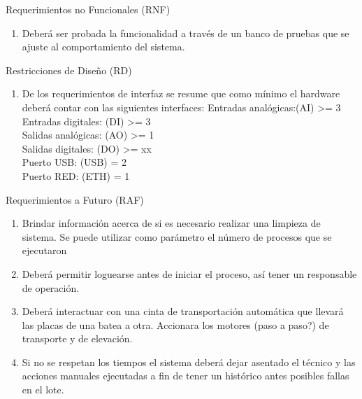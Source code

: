 \begin{enumerate}
\begin{enumerate}
\end{enumerate}

\item Requerimientos no Funcionales (RNF)
\begin{enumerate}
\item Deberá ser probada la funcionalidad a través de un banco de pruebas que se ajuste al comportamiento del sistema. 
\end{enumerate}

\item Restricciones de Diseño (RD)
\begin{enumerate}
\item De los requerimientos de interfaz se resume que como mínimo el hardware deberá contar con las siguientes interfaces:
Entradas analógicas:(AI) >= 3	\\
Entradas digitales: (DI) >= 3	\\
Salidas analógicas: (AO) >= 1	\\
Salidas digitales:  (DO) >= xx	\\
Puerto USB:	  		(USB)  = 2	\\
Puerto RED:	  		(ETH)  = 1	\\
\end{enumerate}

\item Requerimientos a Futuro (RAF)
\begin{enumerate}
\item Brindar información acerca de si es necesario realizar una limpieza de sistema. Se puede utilizar como parámetro el número de procesos que se ejecutaron 	 	 	
\item Deberá permitir loguearse antes de iniciar el proceso, así tener un responsable de operación.
\item Deberá interactuar con una cinta de transportación automática que llevará las placas de una batea a otra. Accionara los motores (paso a paso?) de transporte y de elevación.
\item Si no se respetan los tiempos el sistema deberá dejar asentado el técnico y las acciones manuales ejecutadas a fin de tener un histórico antes posibles fallas en el lote.
\end{enumerate}
